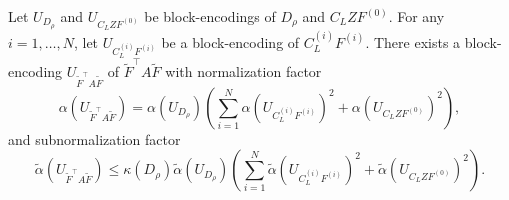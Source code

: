 \documentclass[onefignum,onetabnum]{siamart251216}
\begin{document}
\begin{theorem}
Let $U_{D_\rho}$ and $U_{C_L Z F^{(0)}}$ be block-encodings of $D_\rho$ and $C_L Z F^{(0)}$. For any $i=1, \dots, N$, let  $U_{C_L^{(i)} F^{(i)}}$ be a block-encoding of $C_L^{(i)} F^{(i)}$. There exists a block-encoding $U_{\tilde{F}^\top A \tilde{F}}$ of $\tilde{F}^\top A \tilde{F}$ with normalization factor
\begin{equation}
\alpha (U_{\tilde{F}^\top A \tilde{F}}) = \alpha(U_{D_\rho}) \left( \sum_{i=1}^{N} \alpha\left(U_{C_L^{(i)} F^{(i)}}\right)^2 + \alpha \left( U_{C_L Z F^{(0)}} \right)^2 \right),
\label{eq:normalization_BE_DD}
\end{equation}
and subnormalization factor
\begin{equation}
\tilde{\alpha} (U_{\tilde{F}^\top A \tilde{F}}) \leq \kappa(D_\rho) \tilde{\alpha}(U_{D_\rho}) \left(\sum_{i=1}^{N} \tilde{\alpha}\left(U_{C_L^{(i)} F^{(i)}}\right)^2 + \tilde{\alpha}\left( U_{C_L Z F^{(0)}} \right)^2 \right).
\label{eq:subnormalization_BE_DD}
\end{equation}
\label{thm:th_BE_DD}
\end{theorem}
\end{document}
